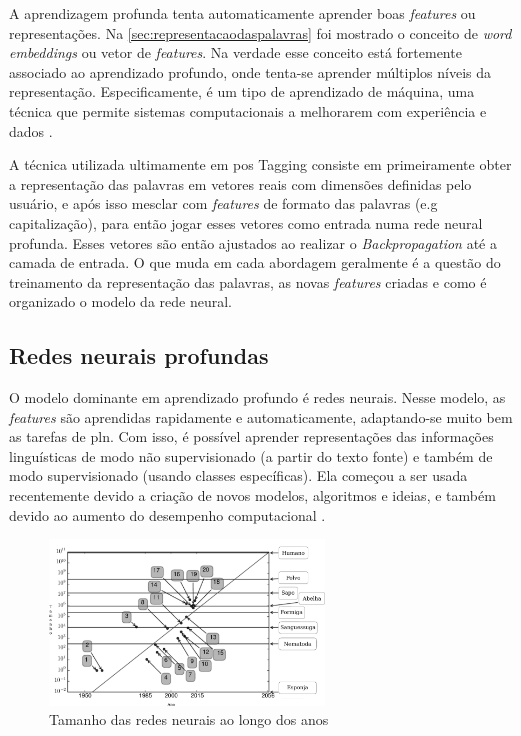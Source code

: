 A aprendizagem profunda tenta automaticamente aprender boas \textit{features} ou representações. Na \autoref{sec:representacaodaspalavras} foi mostrado o conceito de \textit{word embeddings} ou vetor de \textit{features}. Na verdade esse conceito está fortemente associado ao aprendizado profundo, onde tenta-se aprender múltiplos níveis da representação. Especificamente, é um tipo de aprendizado de máquina, uma técnica que permite sistemas computacionais a melhorarem com experiência e dados \cite{Bengio-et-al-2015-Book}.


A técnica utilizada ultimamente em \ac{pos} Tagging consiste em primeiramente obter a representação das palavras em vetores reais com dimensões definidas pelo usuário, e após isso mesclar com \textit{features} de formato das palavras (e.g capitalização), para então jogar esses vetores como entrada numa rede neural profunda. Esses vetores são então ajustados ao realizar o \textit{Backpropagation} até a camada de entrada. O que muda em cada abordagem geralmente é a questão do treinamento da representação das palavras, as novas \textit{features} criadas e como é organizado o modelo da rede neural.



\subsection{Redes neurais profundas} \label{subsec:redesneuraisprofundas}

O modelo dominante em aprendizado profundo é redes neurais. Nesse modelo, as \textit{features} são aprendidas rapidamente e automaticamente, adaptando-se muito bem as tarefas de \ac{pln}. Com isso, é possível aprender representações das informações linguísticas de modo não supervisionado (a partir do texto fonte) e também de modo supervisionado (usando classes específicas). Ela começou a ser usada recentemente devido a criação de novos modelos, algoritmos e ideias, e também devido ao aumento do desempenho computacional \cite{deeplearningfornlp}.

\begin{figure}[!htb]
\centering
\caption{Tamanho das redes neurais ao longo dos anos} \label{fig:aumentorntam}
\includegraphics[width=0.65\textwidth]{img/aumentorntam.pdf}
\end{figure}

